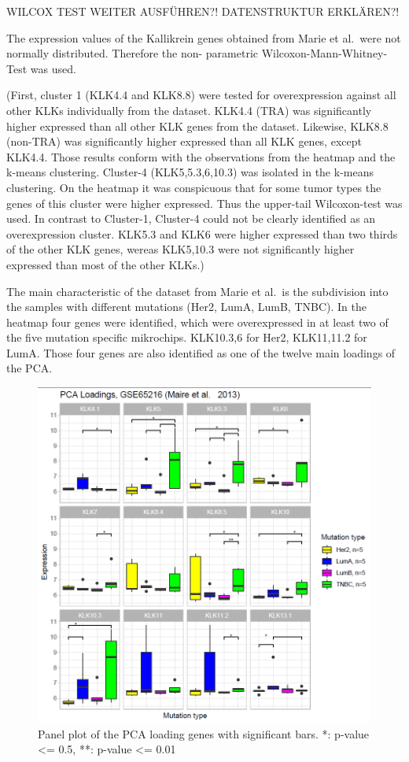 \documentclass[
]{article}
\begin{document}
WILCOX TEST WEITER AUSFÜHREN?! DATENSTRUKTUR ERKLÄREN?!

The expression values of the Kallikrein genes obtained from Marie et
al.~were not normally distributed. Therefore the non- parametric
Wilcoxon-Mann-Whitney-Test was used.

(First, cluster 1 (KLK4.4 and KLK8.8) were tested for overexpression
against all other KLKs individually from the dataset. KLK4.4 (TRA) was
significantly higher expressed than all other KLK genes from the
dataset. Likewise, KLK8.8 (non-TRA) was significantly higher expressed
than all KLK genes, except KLK4.4. Those results conform with the
observations from the heatmap and the k-means clustering. Cluster-4
(KLK5,5.3,6,10.3) was isolated in the k-means clustering. On the heatmap
it was conspicuous that for some tumor types the genes of this cluster
were higher expressed. Thus the upper-tail Wilcoxon-test was used. In
contrast to Cluster-1, Cluster-4 could not be clearly identified as an
overexpression cluster. KLK5.3 and KLK6 were higher expressed than two
thirds of the other KLK genes, wereas KLK5,10.3 were not significantly
higher expressed than most of the other KLKs.)

The main characteristic of the dataset from Marie et al.~is the
subdivision into the samples with different mutations (Her2, LumA, LumB,
TNBC). In the heatmap four genes were identified, which were
overexpressed in at least two of the five mutation specific mikrochips.
KLK10.3,6 for Her2, KLK11,11.2 for LumA. Those four genes are also
identified as one of the twelve main loadings of the PCA.

\begin{figure}

{\centering \includegraphics[width=0.5\linewidth]{images/breast_panel_loadings_test} 

}

\caption{Panel plot of the PCA loading genes with significant bars. *: p-value <= 0.5, **: p-value <= 0.01 }\label{fig:Hypothesis test panel plot with significant bars}
\end{figure}
\end{document}
